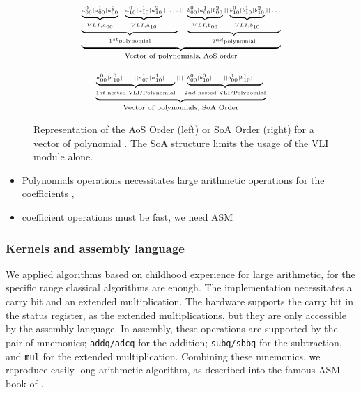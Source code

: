 \documentclass[oribibl]{llncs2e/llncs}
\begin{document}
\begin{figure}
    \begin{minipage}{0.50\linewidth}
        \begin{eqnarray}
        \tiny{
                 \underbrace{
                 \underbrace{ \underbrace{a^0_{00} | a^1_{00} | a^2_{00}}_{VLI, a_{00} } || \underbrace{a^0_{10} | a^1_{10} | a^2_{10}}_{VLI, a_{10}} ||   \dots  }_{1^{st} \textrm{polynomial}} 
                  |||    \underbrace{ \underbrace{b^0_{00} | a^1_{00} | b^2_{00}}_{VLI, b_{00} } || \underbrace{b^0_{10} | b^1_{10} | b^2_{10}}_{VLI, b_{10}} ||   \dots  }_{2^{nd} \textrm{polynomial} } }_{\textrm{Vector of polynomials, AoS order}} \nonumber
            }
        \end{eqnarray}
    \end{minipage}
\begin{minipage}{0.50\linewidth}
    \begin{eqnarray}
    \tiny{
        \underbrace{
        \underbrace{a^0_{00} | a^0_{10} | \dots || a^1_{00} | a^1_{10} | \dots  }_{1st  \textrm{ nested VLI/Polynomial} } |||  \underbrace{b^0_{00} | b^0_{10} | \dots || b^1_{00} | b^1_{10} | \dots  }_{2nd  \textrm{ nested VLI/Polynomial} }
        }_{\textrm{Vector of polynomials, SoA Order}} \nonumber }
        \end{eqnarray}
\end{minipage}
\caption{Representation of the AoS Order (left) or SoA Order (right) for a vector of polynomial \label{AOSSOA}.  The SoA structure limits the usage of the VLI module alone.}
\end{figure}

\begin{itemize}
\item Polynomials operations necessitates large arithmetic operations for the coefficients ,
\item  coefficient operations must be fast, we need ASM 
\end{itemize}


\subsubsection{Kernels and assembly  language}





We applied algorithms based on childhood  experience for large arithmetic, for the specific range classical algorithms are enough.
The implementation necessitates a carry bit and an extended multiplication. The hardware supports
the carry bit in the status register, as the extended multiplications, but they are only accessible by the assembly language.
In assembly, these operations  are supported by the pair of mnemonics; \texttt{addq/adcq} for the addition; \texttt{subq/sbbq} for the subtraction, and \texttt{mul} for the extended multiplication.   
Combining these mnemonics, we reproduce easily long arithmetic algorithm, as described into the famous  ASM book of \cite{Hyde:2003:AAL:861534}. 
\end{document}
